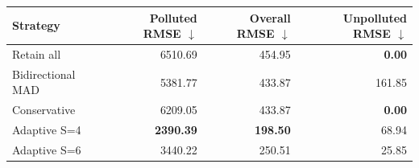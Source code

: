 \begingroup
{}
\begin{tabular}{lrrr}
\toprule
Strategy & Polluted RMSE $\downarrow$ & Overall RMSE $\downarrow$ & Unpolluted RMSE $\downarrow$ \\
\midrule
Retain all & 6510.69 & 454.95 & \textbf{0.00} \\
Bidirectional MAD & 5381.77 & 433.87 & 161.85 \\
Conservative & 6209.05 & 433.87 & \textbf{0.00} \\
Adaptive S=4 & \textbf{2390.39} & \textbf{198.50} & 68.94 \\
Adaptive S=6 & 3440.22 & 250.51 & 25.85 \\
\bottomrule
\end{tabular}
\endgroup
